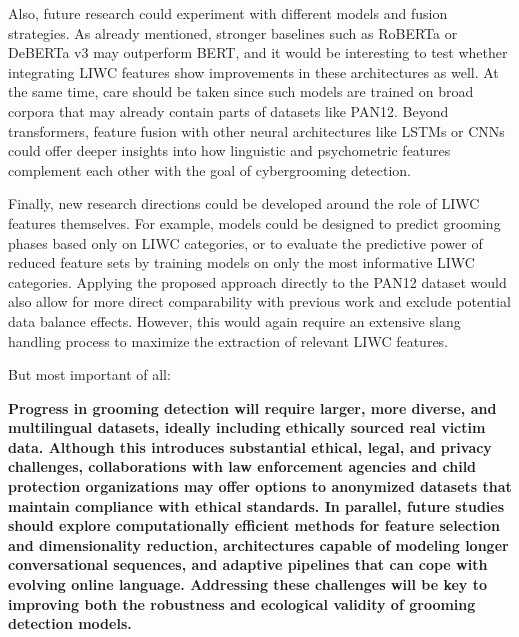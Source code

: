 Also, future research could experiment with different models and fusion strategies. As already mentioned, stronger baselines such as RoBERTa \cite{liu2019roberta} or DeBERTa v3 \cite{he2023debertav3} may outperform BERT, and it would be interesting to test whether integrating LIWC features show improvements in these architectures as well. At the same time, care should be taken since such models are trained on broad corpora that may already contain parts of datasets like PAN12. Beyond transformers, feature fusion with other neural architectures like LSTMs or CNNs could offer deeper insights into how linguistic and psychometric features complement each other with the goal of cybergrooming detection.  

Finally, new research directions could be developed around the role of LIWC features themselves. For example, models could be designed to predict grooming phases based only on LIWC categories, or to evaluate the predictive power of reduced feature sets by training models on only the most informative LIWC categories. Applying the proposed approach directly to the PAN12 dataset would also allow for more direct comparability with previous work and exclude potential data balance effects. However, this would again require an extensive slang handling process to maximize the extraction of relevant LIWC features.


But most important of all:
 
\textbf{Progress in grooming detection will require larger, more diverse, and multilingual datasets, ideally including ethically sourced real victim data. Although this introduces substantial ethical, legal, and privacy challenges, collaborations with law enforcement agencies and child protection organizations may offer options to anonymized datasets that maintain compliance with ethical standards. In parallel, future studies should explore computationally efficient methods for feature selection and dimensionality reduction, architectures capable of modeling longer conversational sequences, and adaptive pipelines that can cope with evolving online language. Addressing these challenges will be key to improving both the robustness and ecological validity of grooming detection models.}  

